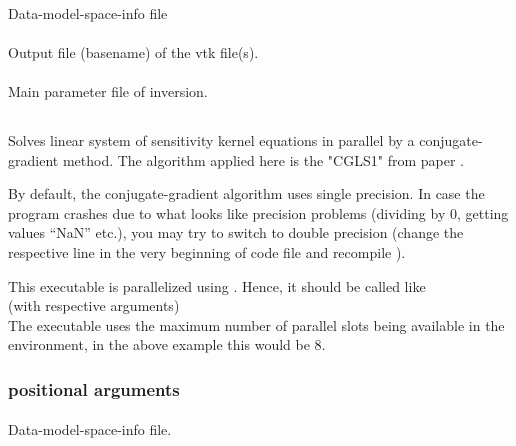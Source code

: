 \paragraph{}
Data-model-space-info file   
\paragraph{}
Output file (basename) of the vtk file(s).
\paragraph{}
Main parameter file of inversion.  
%
%

\subsection{} \label{programs_scripts,sec:bin_prog,sec:solve_cgls_kernel_sys}
Solves linear system of sensitivity kernel equations in parallel by a conjugate-gradient method.
The algorithm applied here is the "CGLS1" from paper \cite{bjorck1998stability}.

By default, the conjugate-gradient algorithm uses single precision. In case the program crashes due to what
looks like precision problems (dividing by 0, getting values ``NaN'' etc.), you may try to switch to 
double precision (change the respective line in the very beginning of code file 
and recompile ).

This executable is parallelized using . Hence, it should be called like\\
 (with respective arguments)\\
The executable uses the maximum number of parallel slots being available in the  environment, in 
the above example this would be 8.
\subsubsection{positional arguments}
\paragraph{}
Data-model-space-info file.
